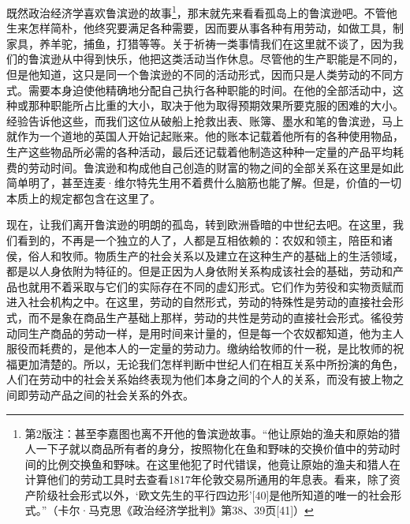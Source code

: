 \documentclass{ctexbook}
\begin{document}
    既然政治经济学喜欢鲁滨逊的故事\footnote{第2版注：甚至李嘉图也离不开他的鲁滨逊故事。“他让原始的渔夫和原始的猎人一下子就以商品所有者的身分，按照物化在鱼和野味的交换价值中的劳动时间的比例交换鱼和野味。在这里他犯了时代错误，他竟让原始的渔夫和猎人在计算他们的劳动工具时去查看1817年伦敦交易所通用的年息表。看来，除了资产阶级社会形式以外，‘欧文先生的平行四边形’[40]是他所知道的唯一的社会形式。”（卡尔·马克思《政治经济学批判》第38、39页[41]）}，那末就先来看看孤岛上的鲁滨逊吧。不管他生来怎样简朴，他终究要满足各种需要，因而要从事各种有用劳动，如做工具，制家具，养羊驼，捕鱼，打猎等等。关于祈祷一类事情我们在这里就不谈了，因为我们的鲁滨逊从中得到快乐，他把这类活动当作休息。尽管他的生产职能是不同的，但是他知道，这只是同一个鲁滨逊的不同的活动形式，因而只是人类劳动的不同方式。需要本身迫使他精确地分配自己执行各种职能的时间。在他的全部活动中，这种或那种职能所占比重的大小，取决于他为取得预期效果所要克服的困难的大小。经验告诉他这些，而我们这位从破船上抢救出表、账簿、墨水和笔的鲁滨逊，马上就作为一个道地的英国人开始记起账来。他的账本记载着他所有的各种使用物品，生产这些物品所必需的各种活动，最后还记载着他制造这种种一定量的产品平均耗费的劳动时间。鲁滨逊和构成他自己创造的财富的物之间的全部关系在这里是如此简单明了，甚至连麦·维尔特先生用不着费什么脑筋也能了解。但是，价值的一切本质上的规定都包含在这里了。
    
    现在，让我们离开鲁滨逊的明朗的孤岛，转到欧洲昏暗的中世纪去吧。在这里，我们看到的，不再是一个独立的人了，人都是互相依赖的：农奴和领主，陪臣和诸侯，俗人和牧师。物质生产的社会关系以及建立在这种生产的基础上的生活领域，都是以人身依附为特征的。但是正因为人身依附关系构成该社会的基础，劳动和产品也就用不着采取与它们的实际存在不同的虚幻形式。它们作为劳役和实物贡赋而进入社会机构之中。在这里，劳动的自然形式，劳动的特殊性是劳动的直接社会形式，而不是象在商品生产基础上那样，劳动的共性是劳动的直接社会形式。徭役劳动同生产商品的劳动一样，是用时间来计量的，但是每一个农奴都知道，他为主人服役而耗费的，是他本人的一定量的劳动力。缴纳给牧师的什一税，是比牧师的祝福更加清楚的。所以，无论我们怎样判断中世纪人们在相互关系中所扮演的角色，人们在劳动中的社会关系始终表现为他们本身之间的个人的关系，而没有披上物之间即劳动产品之间的社会关系的外衣。
    
\end{document}
